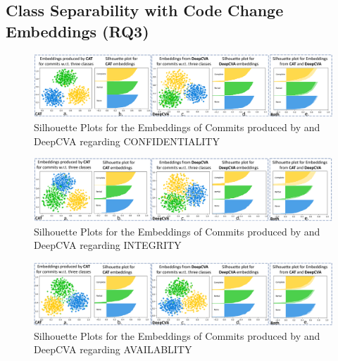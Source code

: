 \subsection{\bf Class Separability with Code Change Embeddings (RQ3)}
\label{sec:separation}


\begin{figure}[t]
	\centering
	\includegraphics[width=6.9in]{graphs/confidentiality}
        \vspace{-6pt}
	\caption{Silhouette Plots for the Embeddings of Commits produced by {\tool} and DeepCVA regarding CONFIDENTIALITY}
	\label{fig:confidentiality}
\end{figure}

\begin{figure}[t]
	\centering
	\includegraphics[width=6.9in]{graphs/integrity}
        \vspace{-6pt}
	\caption{Silhouette Plots for the Embeddings of Commits produced by {\tool} and DeepCVA regarding INTEGRITY}
	\label{fig:integrity}
\end{figure}

\begin{figure}[t]
	\centering
	\includegraphics[width=6.9in]{graphs/availability}
       \vspace{-6pt}
	\caption{Silhouette Plots for the Embeddings of Commits produced by {\tool} and DeepCVA regarding AVAILABLITY}
	\label{fig:availability}
\end{figure}

